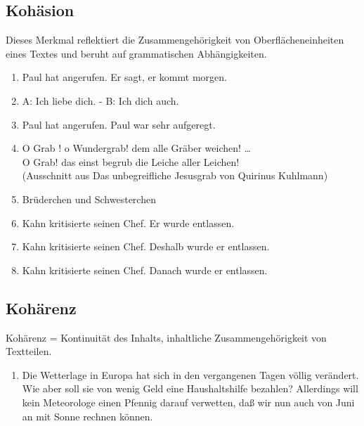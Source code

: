\documentclass[
  letterpaper,
  DIV=11,
  numbers=noendperiod]{scrreprt}
\providecommand{\tightlist}{%
  \setlength{\itemsep}{0pt}\setlength{\parskip}{0pt}}\usepackage{longtable,booktabs,array}
\begin{document}
\hypertarget{kohuxe4sion}{%
\subsection{Kohäsion}\label{kohuxe4sion}}

Dieses Merkmal reflektiert die Zusammengehörigkeit von
Oberflächeneinheiten eines Textes und beruht auf grammatischen
Abhängigkeiten.

\begin{enumerate}
\def\labelenumi{(\arabic{enumi})}
\setcounter{enumi}{1}
\tightlist
\item
  Paul hat angerufen. Er sagt, er kommt morgen.\\
\item
  A: Ich liebe dich. - B: Ich dich auch.\\
\item
  Paul hat angerufen. Paul war sehr aufgeregt.\\
\item
  O Grab ! o Wundergrab! dem alle Gräber weichen! \ldots{}\\
  O Grab! das einst begrub die Leiche aller Leichen!\\
  (Ausschnitt aus Das unbegreifliche Jesusgrab von Quirinus Kuhlmann)\\
\item
  Brüderchen und Schwesterchen\\
\item
  Kahn kritisierte seinen Chef. Er wurde entlassen.\\
\item
  Kahn kritisierte seinen Chef. Deshalb wurde er entlassen.\\
\item
  Kahn kritisierte seinen Chef. Danach wurde er entlassen.\\
\end{enumerate}

\hypertarget{kohuxe4renz}{%
\subsection{Kohärenz}\label{kohuxe4renz}}

Kohärenz = Kontinuität des Inhalts, inhaltliche Zusammengehörigkeit von
Textteilen.

\begin{enumerate}
\def\labelenumi{(\arabic{enumi})}
\setcounter{enumi}{9}
\tightlist
\item
  Die Wetterlage in Europa hat sich in den vergangenen Tagen völlig
  verändert. Wie aber soll sie von wenig Geld eine Haushaltshilfe
  bezahlen? Allerdings will kein Meteorologe einen Pfennig darauf
  verwetten, daß wir nun auch von Juni an mit Sonne rechnen können.
\end{enumerate}
\end{document}
